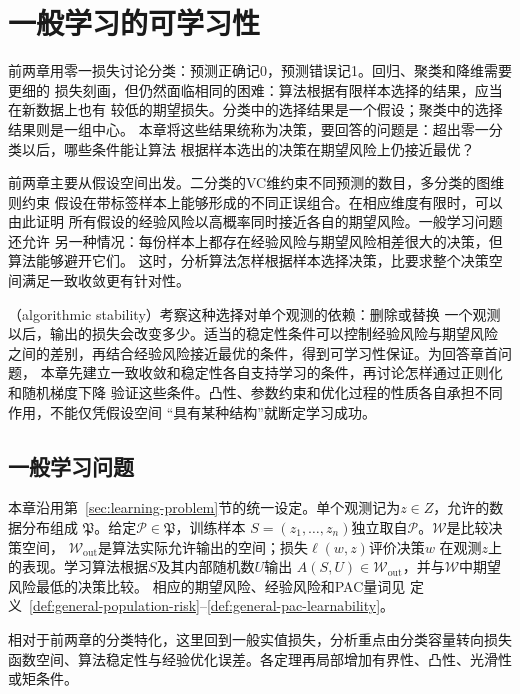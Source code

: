 \chapter{一般学习的可学习性}
\label{chap:convex-learning-and-stability}

前两章用零一损失讨论分类：预测正确记0，预测错误记1。回归、聚类和降维需要更细的
损失刻画，但仍然面临相同的困难：算法根据有限样本选择的结果，应当在新数据上也有
较低的期望损失。分类中的选择结果是一个假设；聚类中的选择结果则是一组中心。
本章将这些结果统称为决策，要回答的问题是：超出零一分类以后，哪些条件能让算法
根据样本选出的决策在期望风险上仍接近最优？

前两章主要从假设空间出发。二分类的VC维约束不同预测的数目，多分类的图维则约束
假设在带标签样本上能够形成的不同正误组合。在相应维度有限时，可以由此证明
所有假设的经验风险以高概率同时接近各自的期望风险。一般学习问题还允许
另一种情况：每份样本上都存在经验风险与期望风险相差很大的决策，但算法能够避开它们。
这时，分析算法怎样根据样本选择决策，比要求整个决策空间满足一致收敛更有针对性。

（algorithmic stability）考察这种选择对单个观测的依赖：删除或替换
一个观测以后，输出的损失会改变多少。适当的稳定性条件可以控制经验风险与期望风险
之间的差别，再结合经验风险接近最优的条件，得到可学习性保证。为回答章首问题，
本章先建立一致收敛和稳定性各自支持学习的条件，再讨论怎样通过正则化和随机梯度下降
验证这些条件。凸性、参数约束和优化过程的性质各自承担不同作用，不能仅凭假设空间
“具有某种结构”就断定学习成功。

\section{一般学习问题}
\label{sec:general-learning-problem}

本章沿用第~\ref{sec:learning-problem}节的统一设定。单个观测记为$z\in Z$，允许的数据分布组成
$\mathfrak P$。给定$\mathcal P\in\mathfrak P$，训练样本
$S=(z_1,\ldots,z_n)$独立取自$\mathcal P$。$\mathcal W$是比较决策空间，
$\mathcal W_{\mathrm{out}}$是算法实际允许输出的空间；损失$\ell(w,z)$评价决策$w$
在观测$z$上的表现。学习算法根据$S$及其内部随机数$U$输出
$A(S,U)\in\mathcal W_{\mathrm{out}}$，并与$\mathcal W$中期望风险最低的决策比较。
相应的期望风险、经验风险和PAC量词见
定义~\ref{def:general-population-risk}--\ref{def:general-pac-learnability}。

相对于前两章的分类特化，这里回到一般实值损失，分析重点由分类容量转向损失函数空间、算法稳定性与经验优化误差。各定理再局部增加有界性、凸性、光滑性或矩条件。

